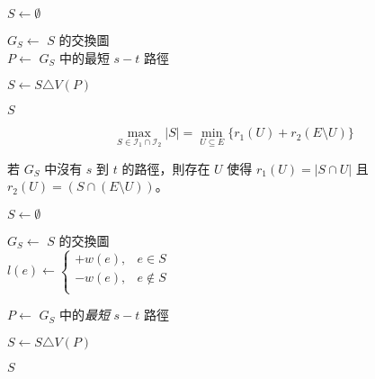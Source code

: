 \documentclass[standalone]{beamer}
\begin{document}
\begin{frame}{}
  \begin{algorithm}[H]

     {
      $S \gets \emptyset$ \\
       {
         {
          $G_S \gets$ $S$ 的交換圖 \\
          $P \gets$ $G_S$ 中的最短 $s-t$ 路徑 \\

           {
             {
              \Break
            }
          }

           {
            $S \gets S \triangle V(P)$
          }
        }
      }
      \Return $S$
    }
  \end{algorithm}
\end{frame}

\begin{frame}{}
  \begin{theorem}
    \[ \max_{S \in \mathcal{I}_1 \cap \mathcal{I}_2}|S| = \min_{U \subseteq E}\{r_1(U) + r_2(E \setminus U)\} \]
  \end{theorem}
   {
    \begin{theorem}
      若 $G_S$ 中沒有 $s$ 到 $t$ 的路徑，則存在 $U$ 使得 $r_1(U) = |S \cap U|$ 且 $r_2(U) = (S \cap (E \setminus U))$。
    \end{theorem}
  }
\end{frame}

\begin{frame}{}
  \begin{algorithm}[H]

     {
      $S \gets \emptyset$ \\

       {
         {
          $G_S \gets$ $S$ 的交換圖 \\
          $l(e) \gets
            \begin{cases}
              +w(e), & e \in S \\
              -w(e), & e \not\in S \\
            \end{cases}$ \\
           {
            $P \gets$ $G_S$ 中的\emph{最短} $s-t$ 路徑 \\

             {
               {
                \Break
              }
            }

             {
              $S \gets S \triangle V(P)$
            }
          }
        }
      }

      \Return $S$
    }
  \end{algorithm}
\end{frame}
\end{document}
